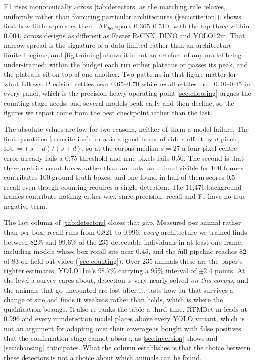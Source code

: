 F1 rises monotonically across \cref{tab:detectors} as the matching rule relaxes, uniformly
rather than favouring particular architectures (\cref{sec:criterion}).
 shows first how little separates them: AP$_{50}$ spans 0.365--0.510,
with the top three within 0.004, across designs as different as Faster R-CNN, DINO and
YOLO12m. That narrow spread is the signature of a data-limited rather than an
architecture-limited regime, and \cref{fig:training} shows it is not an artefact of any
model being under-trained: within the budget each run either plateaus or passes its peak,
and the plateaus sit on top of one another. Two patterns in that figure matter for what
follows. Precision settles near 0.65--0.70 while recall settles near 0.40--0.45 in every
panel, which is the precision-heavy operating point \cref{sec:choosing} argues the counting
stage needs; and several models peak early and then decline, so the figures we report come
from the best checkpoint rather than the last. 

The absolute values are low for two reasons, neither of them a model failure. The first
quantifies \cref{sec:criterion}: for axis-aligned boxes of side $s$ offset by $d$ pixels,
$\mathrm{IoU}=(s-d)/(s+d)$, so at the corpus median $s=27$ a four-pixel centre error already
fails a 0.75 threshold and nine pixels fails 0.50. The second is that these metrics count
boxes rather than animals: an animal visible for 100 frames contributes 100 ground-truth
boxes, and one found in half of them scores 0.5 recall even though counting requires a single
detection. The 11,476 background frames contribute nothing either way, since precision, recall
and F1 have no true-negative term.

The last column of \cref{tab:detectors} closes that gap. Measured per animal rather than per
box, recall runs from 0.821 to 0.996: \emph{every} architecture we trained finds between 82\%
and 99.6\% of the 235 detectable individuals in at least one frame, including models whose box recall
sits near 0.45, and the full pipeline reaches 82 of 83 on held-out video
(\cref{sec:counting}). Over 235 animals these are the paper's tighter estimates, YOLO11m's
98.7\% carrying a 95\% interval of $\pm2.4$ points. At the level a survey cares about, detection is very nearly solved
\emph{on this corpus}, and the animals that go uncounted are lost after it.  tests how far that
survives a change of site and finds it weakens rather than holds, which is where the
qualification belongs. It also re-ranks the table a third time. RTMDet-m leads at
0.996 and every mmdetection model places above every YOLO variant, which is not an argument
for adopting one: their coverage is bought with false positives that the confirmation stage
cannot absorb, as \cref{sec:inversion} shows and \cref{sec:choosing} anticipates. What the
column establishes is that the choice between these detectors is not a choice about which
animals can be found.

